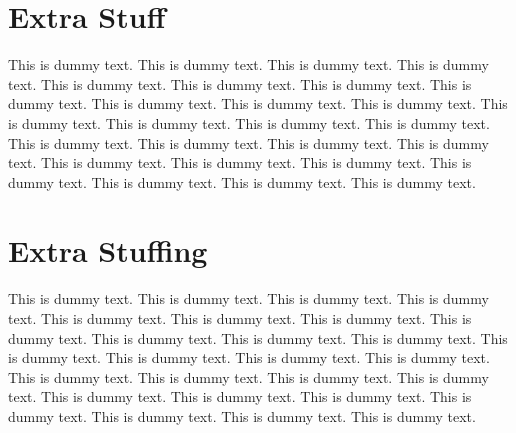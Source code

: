 \documentclass{book}
\begin{document}
\appendix

\noappendicestocpagenum	 %
\addappheadtotoc	%

\renewcommand{\theequation}{A-\arabic{equation}} %
\setcounter{equation}{0}  %

\renewcommand{\thesection}{A-\arabic{section}} %
\setcounter{section}{0}  %

\renewcommand{\thetable}{A-\arabic{table}} %
\setcounter{table}{0}  %

\chapter{Extra Stuff}\label{Extra}

This is dummy text. This is dummy text. This is dummy text. This is dummy text. This is dummy text. This is dummy text. This is dummy text. This is dummy text. This is dummy text. This is dummy text. This is dummy text. This is dummy text. This is dummy text. This is dummy text. This is dummy text. This is dummy text. This is dummy text. This is dummy text. This is dummy text. This is dummy text. This is dummy text. This is dummy text. This is dummy text. This is dummy text. This is dummy text. This is dummy text. 

\chapter{Extra Stuffing}\label{Stuffing}
This is dummy text. This is dummy text. This is dummy text. This is dummy text. This is dummy text. This is dummy text. This is dummy text. This is dummy text. This is dummy text. This is dummy text. This is dummy text. This is dummy text. This is dummy text. This is dummy text. This is dummy text. This is dummy text. This is dummy text. This is dummy text. This is dummy text. This is dummy text. This is dummy text. This is dummy text. This is dummy text. This is dummy text. This is dummy text. This is dummy text. 

\backmatter


\end{document}
